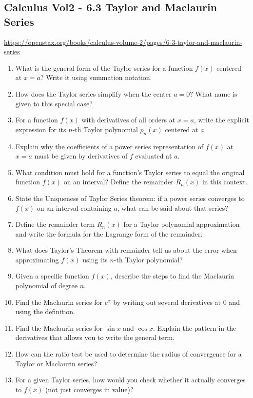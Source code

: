 \subsection{Calculus Vol2 - 6.3 Taylor and Maclaurin Series}

\url{https://openstax.org/books/calculus-volume-2/pages/6-3-taylor-and-maclaurin-series}

\begin{enumerate}
  \item What is the general form of the Taylor series for a function \(f(x)\) centered at \(x=a\)? Write it using summation notation.
  \item How does the Taylor series simplify when the center \(a=0\)? What name is given to this special case?
  \item For a function \(f(x)\) with derivatives of all orders at \(x=a\), write the explicit expression for its \(n\)-th Taylor polynomial \(p_n(x)\) centered at \(a\).
  \item Explain why the coefficients of a power series representation of \(f(x)\) at \(x=a\) must be given by derivatives of \(f\) evaluated at \(a\).
  \item What condition must hold for a function's Taylor series to equal the original function \(f(x)\) on an interval? Define the remainder \(R_n(x)\) in this context.
  \item State the Uniqueness of Taylor Series theorem: if a power series converges to \(f(x)\) on an interval containing \(a\), what can be said about that series?
  \item Define the remainder term \(R_n(x)\) for a Taylor polynomial approximation and write the formula for the Lagrange form of the remainder.
  \item What does Taylor's Theorem with remainder tell us about the error when approximating \(f(x)\) using its \(n\)-th Taylor polynomial?
  \item Given a specific function \(f(x)\), describe the steps to find the Maclaurin polynomial of degree \(n\).
  \item Find the Maclaurin series for \(e^x\) by writing out several derivatives at 0 and using the definition.
  \item Find the Maclaurin series for \(\sin x\) and \(\cos x\). Explain the pattern in the derivatives that allows you to write the general term.
  \item How can the ratio test be used to determine the radius of convergence for a Taylor or Maclaurin series?
  \item For a given Taylor series, how would you check whether it actually converges to \(f(x)\) (not just converges in value)?

\end{enumerate}
